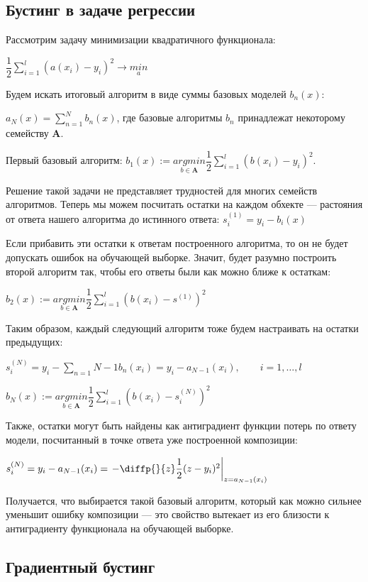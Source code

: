 \documentclass{article}
\begin{document}
\subsection{Бустинг в задаче регрессии}

Рассмотрим задачу минимизации квадратичного функционала:

$\dfrac{1}{2}\sum_{i=1}^{l}(a(x_i)-y_i)^2 \rightarrow \underset{a}{min}$

Будем искать итоговый алгоритм в виде суммы базовых моделей $b_n(x)$:

$a_N(x) = \sum_{n=1}^{N}b_n(x)$, где базовые алгоритмы $b_n$ принадлежат некоторому семейству $\mathbf{A}$.

Первый базовый алгоритм: $b_1(x):= \underset{b\in\mathbf{A}}{argmin} \dfrac{1}{2}\sum_{i=1}^{l}(b(x_i)-y_i)^2$.

Решение такой задачи не представляет трудностей для многих семейств алгоритмов. Теперь мы можем посчитать остатки на каждом обхекте --- растояния от ответа нашего алгоритма до истинного ответа: $s^{(1)}_i = y_i - b_i(x)$

Если прибавить эти остатки к ответам построенного алгоритма, то он не будет допускать ошибок на обучающей выборке. Значит, будет разумно построить второй алгоритм так, чтобы его ответы были как можно ближе к остаткам:

$b_2(x) := \underset{b\in\mathbf{A}}{argmin} \dfrac{1}{2}\sum_{i=1}^{l}(b(x_i)-s^{(1)})^2$

Таким образом, каждый следующий алгоритм тоже будем настраивать на остатки предыдущих:

$s^{(N)}_i = y_i - \sum_{n=1}{N-1}b_n(x_i) = y_i - a_{N-1}(x_i),\qquad i=1,\ldots,l$

$b_N(x):= \underset{b\in\mathbf{A}}{argmin} \dfrac{1}{2}\sum_{i=1}^{l}(b(x_i)-s_i^{(N)})^2$

Также, остатки могут быть найдены как антиградиент функции потерь по ответу модели, посчитанный в точке ответа уже построенной композиции:

$s_i^{(N)} = y_i - a_{N-1}(x_i)= \left.- \diffp{}{z}\dfrac{1}{2}(z-y_i)^2\right|_{z=a_{N-1}(x_i)}$

Получается, что выбирается такой базовый алгоритм, который как можно сильнее уменьшит ошибку композиции — это свойство вытекает из его близости к антиградиенту функционала на обучающей выборке.

\subsection{Градиентный бустинг}
\end{document}
